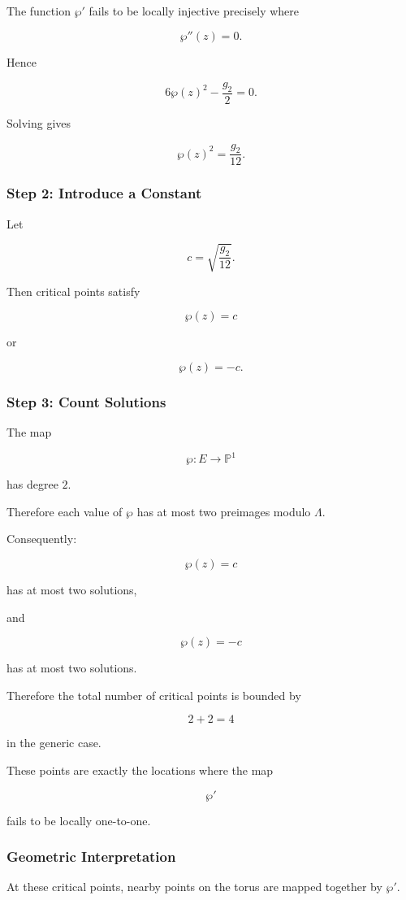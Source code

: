 \documentclass[12pt,a4paper]{article}
\theoremstyle{notespace}
\begin{document}
The function \(\wp'\) fails to be locally injective precisely where

\[
\wp''(z)=0.
\]

Hence

\[
6\wp(z)^2-\frac{g_2}{2}=0.
\]

Solving gives

\[
\wp(z)^2
=
\frac{g_2}{12}.
\]

\subsubsection*{Step 2: Introduce a Constant}

Let

\[
c=
\sqrt{\frac{g_2}{12}}.
\]

Then critical points satisfy

\[
\wp(z)=c
\]

or

\[
\wp(z)=-c.
\]

\subsubsection*{Step 3: Count Solutions}

The map

\[
\wp:E\to\mathbb P^1
\]

has degree \(2\).

Therefore each value of \(\wp\) has at most two preimages modulo \(\Lambda\).

Consequently:

\[
\wp(z)=c
\]

has at most two solutions,

and

\[
\wp(z)=-c
\]

has at most two solutions.

Therefore the total number of critical points is bounded by

\[
2+2=4
\]

in the generic case.

These points are exactly the locations where the map

\[
\wp'
\]

fails to be locally one-to-one.

\subsubsection*{Geometric Interpretation}

At these critical points, nearby points on the torus are mapped together by \(\wp'\).
\end{document}
